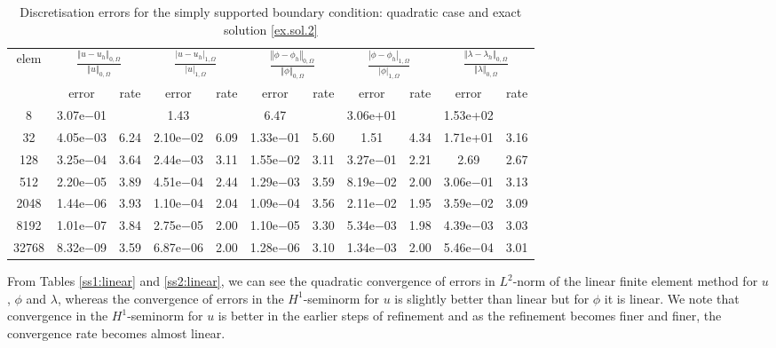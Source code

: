 \documentclass[a4paper,final]{siamltex}
\begin{document}
\begin{table}[htb!]
	\centering
	\caption{Discretisation errors  for the simply supported boundary condition: quadratic case and exact solution \eqref{ex.sol.2}}
	\begin{tabular}{|c|cc|cc|cc|cc|cc|}
		\hline
			\multirow{2}{*}{elem} & \multicolumn{2}{c|}{$\frac{\left\Vert u - u_h\right\Vert_{0,\Omega}}{\left\Vert u\right\Vert_{0,\Omega}}$} & \multicolumn{2}{c|}{$\frac{| u - u_h|_{1,\Omega}}{|u|_{1,\Omega}}$} & \multicolumn{2}{c|}{$\frac{\left\Vert \phi - \phi_h\right\Vert_{0,\Omega}}{\left\Vert \phi\right\Vert_{0,\Omega}}$} & \multicolumn{2}{c|}{$\frac{|\phi - \phi_h|_{1,\Omega}}{| \phi|_{1,\Omega}}$} & \multicolumn{2}{c|}{$\frac{\left\Vert \lambda - \lambda_h\right\Vert_{0,\Omega}}{\left\Vert \lambda\right\Vert_{0,\Omega}}$}\\ \hhline{~----------}
		& error & rate & error & rate & error & rate & error & rate & error & rate \\\hline
 8 & 3.07e$-$01 &   & 1.43 &   & 6.47 &          & 3.06e+01 &          & 1.53e+02 &          \\\hline
   32 & 4.05e$-$03 & 6.24 & 2.10e$-$02 & 6.09 & 1.33e$-$01 & 5.60 & 1.51 & 4.34 & 1.71e+01 & 3.16 \\\hline
  128 & 3.25e$-$04 & 3.64 & 2.44e$-$03 & 3.11 & 1.55e$-$02 & 3.11 & 3.27e$-$01 & 2.21 & 2.69 & 2.67 \\\hline
  512 & 2.20e$-$05 & 3.89 & 4.51e$-$04 & 2.44 & 1.29e$-$03 & 3.59 & 8.19e$-$02 & 2.00 & 3.06e$-$01 & 3.13 \\\hline
 2048 & 1.44e$-$06 & 3.93 & 1.10e$-$04 & 2.04 & 1.09e$-$04 & 3.56 & 2.11e$-$02 & 1.95 & 3.59e$-$02 & 3.09 \\\hline
 8192 & 1.01e$-$07 & 3.84 & 2.75e$-$05 & 2.00 & 1.10e$-$05 & 3.30 & 5.34e$-$03 & 1.98 & 4.39e$-$03 & 3.03 \\\hline
32768 & 8.32e$-$09 & 3.59 & 6.87e$-$06 & 2.00 & 1.28e$-$06 & 3.10 & 1.34e$-$03 & 2.00 & 5.46e$-$04 & 3.01 \\\hline
 
	\end{tabular}
	\label{ss2:quadratic}
\end{table}

From Tables \ref{ss1:linear} and \ref{ss2:linear}, we can see 
the quadratic convergence of errors in $L^2$-norm of the linear finite element method for 
$u$, $\phi$ and $\lambda$, whereas 
the convergence of errors in the $H^1$-seminorm for $u$ is slightly better than linear but for $\phi$ it is linear. 
We note that convergence in the $H^1$-seminorm for  $u$ is better in the earlier steps of refinement and as the 
refinement becomes finer and finer, the convergence rate becomes almost linear.  
\end{document}
